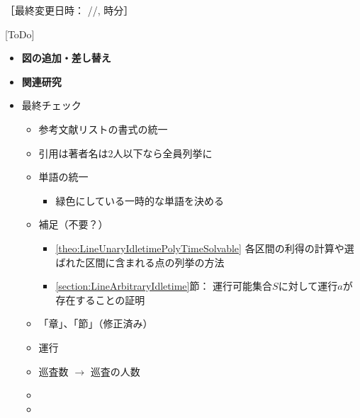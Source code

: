 ［最終変更日時：
{\the\year/\the\month/\the\day, {\the\hour} 時{\the\minute}分}］

 [ToDo]
\begin{itemize}
  \item \textbf{図の追加・差し替え}
  \item \textbf{関連研究}
  \item 最終チェック
  \begin{itemize}
    \item 参考文献リストの書式の統一
    \item 引用は著者名は2人以下なら全員列挙に
    \item 単語の統一
    \begin{itemize}
      \item 緑色にしている一時的な単語を決める
    \end{itemize}
    \item 補足（不要？）
    \begin{itemize}
      \item \ref{theo:LineUnaryIdletimePolyTimeSolvable}
        各区間の利得の計算や選ばれた区間に含まれる点の列挙の方法
      \item \ref{section:LineArbitraryIdletime}節：
        運行可能集合$S$に対して運行$a$が存在することの証明
    \end{itemize}
    \item 「章」、「節」（修正済み）
    \item 運行
    \item 巡査数 $\to$ 巡査の人数
    \item {}
    \item {}
  \end{itemize}
\end{itemize}
